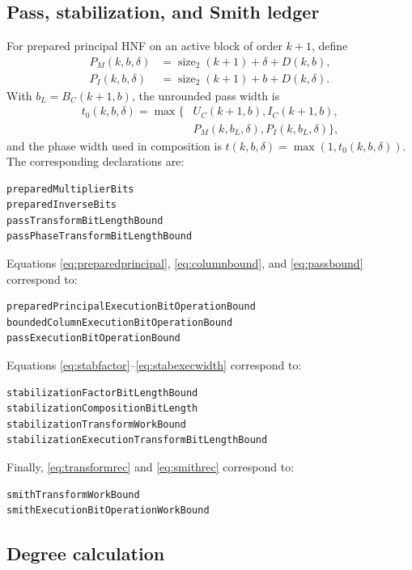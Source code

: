 \documentclass[11pt]{article}
\theoremstyle{definition}
\newcommand{\natsize}{\operatorname{size}_2}
\begin{document}
\subsection{Pass, stabilization, and Smith ledger}

For prepared principal HNF on an active block of order $k+1$, define
\begin{align*}
 P_M(k,b,\delta)&=\natsize(k+1)+\delta+D(k,b),\\
 P_I(k,b,\delta)&=\natsize(k+1)+b+D(k,\delta).
\end{align*}
With $b_L=B_C(k+1,b)$, the unrounded pass width is
\begin{equation}
\begin{split}
 t_0(k,b,\delta)=\max\{&U_C(k+1,b),I_C(k+1,b),\\
 &P_M(k,b_L,\delta),P_I(k,b_L,\delta)\},
\end{split}
\label{eq:passtransformapp}
\end{equation}
and the phase width used in composition is
$t(k,b,\delta)=\max(1,t_0(k,b,\delta))$.
The corresponding declarations are:
\begin{lstlisting}[basicstyle=\ttfamily\footnotesize]
preparedMultiplierBits
preparedInverseBits
passTransformBitLengthBound
passPhaseTransformBitLengthBound
\end{lstlisting}

Equations \eqref{eq:preparedprincipal}, \eqref{eq:columnbound}, and
\eqref{eq:passbound} correspond to:
\begin{lstlisting}[basicstyle=\ttfamily\footnotesize]
preparedPrincipalExecutionBitOperationBound
boundedColumnExecutionBitOperationBound
passExecutionBitOperationBound
\end{lstlisting}
Equations \eqref{eq:stabfactor}--\eqref{eq:stabexecwidth} correspond to:
\begin{lstlisting}[basicstyle=\ttfamily\footnotesize]
stabilizationFactorBitLengthBound
stabilizationCompositionBitLength
stabilizationTransformWorkBound
stabilizationExecutionTransformBitLengthBound
\end{lstlisting}
Finally, \eqref{eq:transformrec} and \eqref{eq:smithrec} correspond to:
\begin{lstlisting}[basicstyle=\ttfamily\footnotesize]
smithTransformWorkBound
smithExecutionBitOperationWorkBound
\end{lstlisting}

\subsection{Degree calculation}
\end{document}
